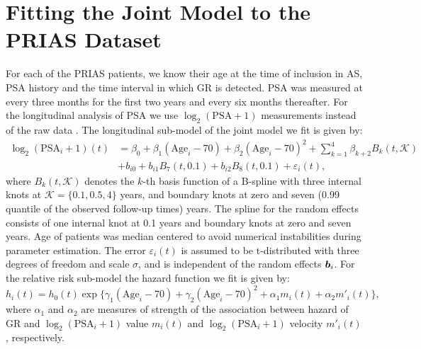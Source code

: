 
\section{Fitting the Joint Model to the PRIAS Dataset}
\label{sec : param_estimates_jm_fit_prias}
For each of the PRIAS patients, we know their age at the time of inclusion in AS, PSA history and the time interval in which GR is detected. PSA was measured at every three months for the first two years and every six months thereafter. For the longitudinal analysis of PSA we use $\log_2 (\mbox{PSA} + 1)$ measurements instead of the raw data \citep{lin2000latent,pearson1994mixed}. The longitudinal sub-model of the joint model we fit is given by:
\begin{equation}
\label{eq : long_model_prias_web}
\begin{aligned}
\log_2 (\mbox{PSA}_i + 1)(t) &= \beta_0 + \beta_1 (\mbox{Age}_i-70) + \beta_2 (\mbox{Age}_i-70)^2 + \sum_{k=1}^4 \beta_{k+2} B_k(t,\mathcal{K})\\ 
&+  b_{i0} + b_{i1} B_7(t, 0.1) + b_{i2} B_8(t, 0.1) +
\varepsilon_i(t),
\end{aligned}
\end{equation}
where $B_k(t, \mathcal{K})$ denotes the $k$-th basis function of a B-spline with three internal knots at $\mathcal{K} =\{0.1, 0.5, 4\}$ years, and boundary knots at zero and seven (0.99 quantile of the observed follow-up times) years. The spline for the random effects consists of one internal knot at 0.1 years and boundary knots at zero and seven years. Age of patients was median centered to avoid numerical instabilities during parameter estimation. The error $\varepsilon_i(t)$ is assumed to be t-distributed with three degrees of freedom and scale $\sigma$, and is independent of the random effects $\boldsymbol{b}_i$. For the relative risk sub-model the hazard function we fit is given by:
\begin{equation}
\label{eq : hazard_prias_web}
h_i(t) = h_0(t) \exp\big\{\gamma_1 (\mbox{Age}_i-70)  + \gamma_2 (\mbox{Age}_i-70)^2 + \alpha_1 m_i(t) + \alpha_2 m'_i(t)\big\},
\end{equation}
where $\alpha_1$ and $\alpha_2$ are measures of strength of the association between hazard of GR and $\log_2 (\mbox{PSA}_i + 1)$ value $m_i(t)$ and $\log_2 (\mbox{PSA}_i + 1)$ velocity $m'_i(t)$, respectively.

\clearpage

